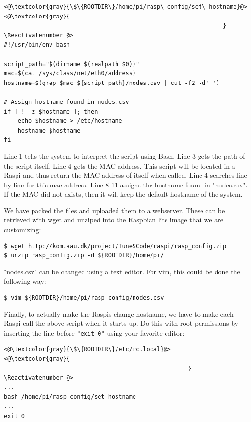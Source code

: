\Suppressnumber\begin{lstlisting}[]
<@\textcolor{gray}{\$\{ROOTDIR\}/home/pi/rasp\_config/set\_hostname}@>
<@\textcolor{gray}{
---------------------------------------------------------------}
\Reactivatenumber @>
#!/usr/bin/env bash

script_path="$(dirname $(realpath $0))"
mac=$(cat /sys/class/net/eth0/address)
hostname=$(grep $mac ${script_path}/nodes.csv | cut -f2 -d' ')

# Assign hostname found in nodes.csv
if [ ! -z $hostname ]; then
    echo $hostname > /etc/hostname
    hostname $hostname
fi
\end{lstlisting}
\FloatBarrier
\vspace{-5mm}

Line 1 tells the system to interpret the script using Bash. Line 3 gets the
path of the script itself. Line 4 gets the MAC address. This script will be
located in a \ac{Raspi} and thus return the MAC address of itself when called.
Line 4 searches line by line for this mac address.
Line 8-11 assigns the hostname found in "nodes.csv". If the MAC did not exists,
then it will keep the default hostname of the system.


We have packed the files and uploaded them to a webserver. These can be
retrieved with wget and unziped into the Raspbian lite image that
we are customizing:

\begin{lstlisting}[]
$ wget http://kom.aau.dk/project/TuneSCode/raspi/rasp_config.zip
$ unzip rasp_config.zip -d ${ROOTDIR}/home/pi/
\end{lstlisting}
\FloatBarrier
\vspace{-5mm}

"nodes.csv" can be changed using a text editor. For vim, this could be done
the following way:
\begin{lstlisting}[]
$ vim ${ROOTDIR}/home/pi/rasp_config/nodes.csv
\end{lstlisting}
\FloatBarrier
\vspace{-5mm}


Finally, to actually make the \ac{Raspi}s change hostname, we have to make
each \ac{Raspi} call the above script when it starts up.
Do this with root permissions by inserting the line before
\texttt{"exit 0"} using your favorite editor:

\Suppressnumber\begin{lstlisting}[]
<@\textcolor{gray}{\$\{ROOTDIR\}/etc/rc.local}@>
<@\textcolor{gray}{
-----------------------------------------------------}
\Reactivatenumber @>
...
bash /home/pi/rasp_config/set_hostname
...
exit 0
\end{lstlisting}
\FloatBarrier
\vspace{-5mm}


